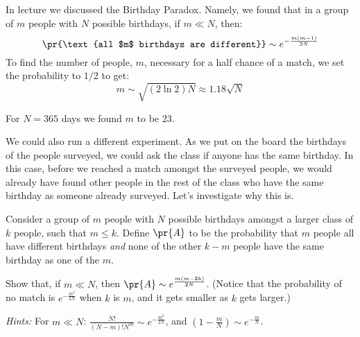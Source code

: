 \documentclass[handout]{mcs}
\begin{document}
\begin{problem}{15}
In lecture we discussed the Birthday Paradox. Namely, we found that in a group of $m$ people with $N$ possible birthdays, if $m \ll N$, then:
\[
\pr{\text{all $m$ birthdays are different}} \sim e^{-\frac{m(m-1)}{2N}}
\]
To find the number of people, $m$, necessary for a half chance of a match, we set the probability to $1/2$ to get:
\[
m \sim \sqrt{(2\ln2)N} \approx 1.18\sqrt{N}
\]

For $N = 365$ days we found $m$ to be 23.

We could also run a different experiment. As we put on the board the birthdays of the people surveyed, we could ask the class if anyone has the same birthday. In this case, before we reached a match amongst the surveyed people, we would already have found other people in the rest of the class who have the same birthday as someone already surveyed. Let's investigate why this is.

\bparts
{} Consider a group of $m$ people with $N$ possible birthdays amongst a larger class of $k$ people, such that $m \leq k$. Define $\pr{A}$ to be the probability that $m$ people all have different birthdays \textit{and} none of the other $k-m$ people have the same birthday as one of the $m$.

Show that, if $m \ll N$, then $\pr{A} \sim e^{\frac{m(m-2k)}{2N}}$. (Notice that the probability of no match is $e^{-\frac{m^2}{2N}}$ when $k$ is $m$, and it gets smaller as $k$ gets larger.)

\hspace{0.5in} \textit{Hints:} For $m \ll N$: $\frac{N!}{(N-m)!N^m} \sim e^{-\frac{m^2}{2N}}$, and $(1-\frac{m}{N}) \sim e^{-\frac{m}{N}}$.



\end{problem}
\end{document}
